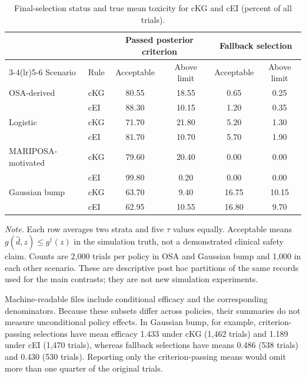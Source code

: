 \documentclass[11pt]{article}
\newcommand{\rev}[1]{{#1}}
\begin{document}
\begin{table}[H]
\centering
\footnotesize
\setlength{\tabcolsep}{3pt}
\caption{Final-selection status and true mean toxicity for cKG and cEI (percent of all trials).}
\label{tab:selection_partition}
\begin{tabular}{@{}llcccc@{}}
\toprule
& & \multicolumn{2}{c}{Passed posterior criterion} & \multicolumn{2}{c}{Fallback selection} \\
\cmidrule(lr){3-4}\cmidrule(lr){5-6}
Scenario & Rule & Acceptable & Above limit & Acceptable & Above limit \\
\midrule
OSA-derived & cKG & 80.55 & 18.55 & 0.65 & 0.25 \\
& cEI & 88.30 & 10.15 & 1.20 & 0.35 \\
Logistic & cKG & 71.70 & 21.80 & 5.20 & 1.30 \\
& cEI & 81.70 & 10.70 & 5.70 & 1.90 \\
MARIPOSA-motivated & cKG & 79.60 & 20.40 & 0.00 & 0.00 \\
& cEI & 99.80 & 0.20 & 0.00 & 0.00 \\
Gaussian bump & cKG & 63.70 & 9.40 & 16.75 & 10.15 \\
& cEI & 62.95 & 10.55 & 16.80 & 9.70 \\
\bottomrule
\end{tabular}
\vspace{3pt}
\begin{minipage}{0.98\linewidth}
\scriptsize\raggedright
\textit{Note.} Each row averages two strata and five $\tau$ values equally. Acceptable means $g(\hat d,z)\le g^\dagger(z)$ in the simulation truth, not a demonstrated clinical safety claim. Counts are 2,000 trials per policy in OSA and Gaussian bump and 1,000 in each other scenario. These are descriptive post hoc partitions of the same records used for the main contrasts; they are not new simulation experiments.
\end{minipage}
\end{table}

\rev{Machine-readable files include conditional efficacy and the corresponding denominators. Because these subsets differ across policies, their summaries do not measure unconditional policy effects.} In Gaussian bump, for example, criterion-passing selections have mean efficacy 1.433 under cKG (1,462 trials) and 1.189 under cEI (1,470 trials), whereas fallback selections have means 0.486 (538 trials) and 0.430 (530 trials). Reporting only the criterion-passing means would omit more than one quarter of the original trials.
\end{document}
